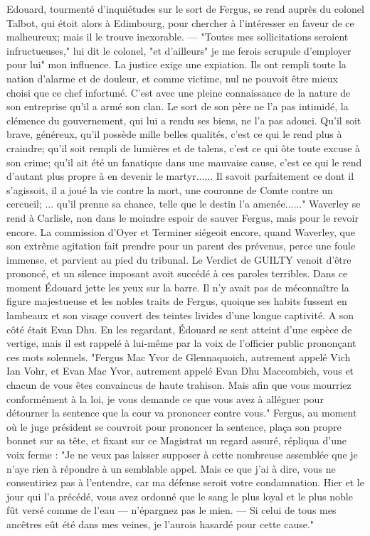 Edouard, tourmenté d'inquiétudes sur le sort de Fergus, se rend auprès du colonel Talbot, qui étoit alors à Edimbourg, pour chercher à l'intéresser en faveur de ce malheureux; mais il le trouve inexorable. — "Toutes mes sollicitations seroient infructueuses," lui dit le colonel, "et d'ailleurs" je me ferois scrupule d'employer pour lui" mon influence. La justice exige une expiation. Ils ont rempli toute la nation d'alarme et de douleur, et comme victime,\setcounter{page}{372} nul ne pouvoit être mieux choisi que ce chef infortuné. C'est avec une pleine connaissance de la nature de son entreprise qu'il a armé son clan. Le sort de son père ne l'a pas intimidé, la clémence du gouvernement, qui lui a rendu ses biens, ne l'a pas adouci. Qu'il soit brave, généreux, qu'il possède mille belles qualités, c'est ce qui le rend plus à craindre; qu'il soit rempli de lumières et de talens, c'est ce qui ôte toute excuse à son crime; qu'il ait été un fanatique dans une mauvaise cause, c'est ce qui le rend d'autant plus propre à en devenir le martyr...... Il savoit parfaitement ce dont il s'agissoit, il a joué la vie contre la mort, une couronne de Comte contre un cercueil; ... qu'il prenne sa chance, telle que le destin l'a amenée......"
Waverley se rend à Carlisle, non dans le moindre espoir de sauver Fergus, mais pour le revoir encore.
La commission d'Oyer et Terminer siégeoit encore, quand Waverley, que son extrême agitation fait prendre pour un parent des prévenus, perce une foule immense, et parvient au pied du tribunal. Le Verdict de GUILTY venoit d'être prononcé, et un silence imposant avoit succédé à ces paroles\setcounter{page}{373} terribles. Dans ce moment Édouard jette les yeux sur la barre. Il n'y avait pas de méconnaître la figure majestueuse et les nobles traits de Fergus, quoique ses habits fussent en lambeaux et son visage couvert des teintes livides d'une longue captivité. A son côté était Evan Dhu. En les regardant, Édouard se sent atteint d'une espèce de vertige, mais il est rappelé à lui-même par la voix de l'officier public prononçant ces mots solennels. "Fergus Mac Yvor de Glennaquoich, autrement appelé Vich Ian Vohr, et Evan Mac Yvor, autrement appelé Evan Dhu Maccombich, vous et chacun de vous êtes convaincus de haute trahison. Mais afin que vous mourriez conformément à la loi, je vous demande ce que vous avez à alléguer pour détourner la sentence que la cour va prononcer contre vous."
Fergus, au moment où le juge président se couvroit pour prononcer la sentence, plaça son propre bonnet sur sa tête, et fixant sur ce Magistrat un regard assuré, répliqua d'une voix ferme : "Je ne veux pas laisser supposer à cette nombreuse assemblée que je n'aye rien à répondre à un semblable appel. Mais ce que j'ai à dire, vous ne consentiriez pas à l'entendre,\setcounter{page}{374} car ma défense seroit votre condamnation. Hier et le jour qui l'a précédé, vous avez ordonné que le sang le plus loyal et le plus noble fût versé comme de l'eau — n'épargnez pas le mien. — Si celui de tous mes ancêtres eût été dans mes veines, je l'aurois hasardé pour cette cause."
